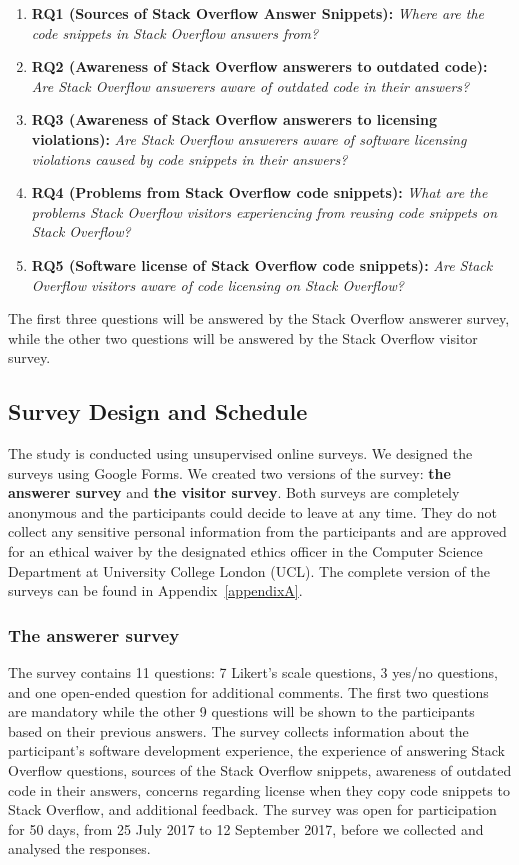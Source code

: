 \documentclass{svjour3}                     %
\begin{document}
\begin{enumerate}
	\item \textbf{RQ1 (Sources of Stack Overflow Answer Snippets):} \textit{Where are the code snippets in Stack Overflow answers from?}
	\item \textbf{RQ2 (Awareness of Stack Overflow answerers to outdated code):} \textit{Are Stack Overflow answerers aware of outdated code in their answers?}
	\item \textbf{RQ3 (Awareness of Stack Overflow answerers to licensing violations):} \textit{Are Stack Overflow answerers aware of software licensing
		violations caused by code snippets in their answers?}
	\item \textbf{RQ4 (Problems from Stack Overflow code snippets):} \textit{What are the problems Stack Overflow visitors experiencing from reusing code snippets on Stack Overflow?}
	\item \textbf{RQ5 (Software license of Stack Overflow code
            snippets):} \textit{Are Stack Overflow visitors aware of code licensing on Stack Overflow?}
\end{enumerate}

The first three questions will be answered by
the Stack Overflow answerer survey, while the other two questions will be
answered by the Stack Overflow visitor survey.

\subsection{Survey Design and Schedule}
The study is conducted using unsupervised online surveys. We designed the surveys using
Google Forms. We created two versions of the
survey: \textbf{the answerer survey} and \textbf{the visitor survey}. Both
surveys are completely anonymous and the participants could decide to leave at
any time. They do not collect any sensitive personal information from the
participants and are approved for an ethical waiver by the designated ethics
officer in the Computer Science Department at University College London (UCL). 
The complete version of the surveys can be found in 
Appendix~\ref{appendixA}.

\subsubsection{The answerer survey} 
The survey contains 11 questions: 7 Likert's
scale questions, 3 yes/no questions, and one open-ended question for additional
comments. The first two questions are mandatory while the other 9 questions will
be shown to the participants based on their previous answers. The survey
collects information about the participant's software development experience, the
experience of answering Stack Overflow questions, sources of the Stack Overflow
snippets, awareness of outdated code in their answers, concerns regarding
license when they copy code snippets to Stack Overflow, and additional
feedback. The survey was open for participation for 50 days, from 25 July 2017
to 12 September 2017, before we collected and analysed the responses.
\end{document}
